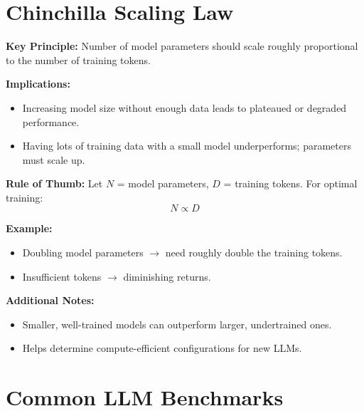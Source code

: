 \documentclass[a4paper, 12pt]{article}
\begin{document}
\vspace{1em}

\section*{Chinchilla Scaling Law}

\textbf{Key Principle:} Number of model parameters should scale roughly proportional to the number of training tokens.

\textbf{Implications:}
\begin{itemize}
    \item Increasing model size without enough data leads to plateaued or degraded performance.
    \item Having lots of training data with a small model underperforms; parameters must scale up.
\end{itemize}

\textbf{Rule of Thumb:} Let $N$ = model parameters, $D$ = training tokens. For optimal training:
\[
N \propto D
\]

\textbf{Example:}
\begin{itemize}
    \item Doubling model parameters $\rightarrow$ need roughly double the training tokens.
    \item Insufficient tokens $\rightarrow$ diminishing returns.
\end{itemize}

\textbf{Additional Notes:}
\begin{itemize}
    \item Smaller, well-trained models can outperform larger, undertrained ones.
    \item Helps determine compute-efficient configurations for new LLMs.
\end{itemize}

\vspace{1em}

\section*{Common LLM Benchmarks}
\end{document}

